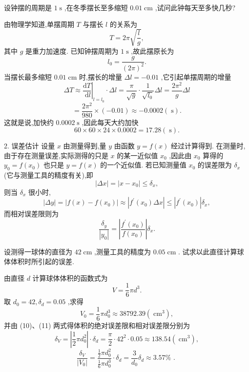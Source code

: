 \begin{example}
设钟摆的周期是 \(1\mathrm{\;s}\) ,在冬季摆长至多缩短 \({0.01}\mathrm{\;{cm}}\) ,试问此钟每天至多快几秒?
\end{example}


\begin{solution}
由物理学知道,单摆周期 \(T\) 与摆长 \(l\) 的关系为
\[
T = {2\pi }\sqrt{\frac{l}{g}},
\]
其中 \(g\) 是重力加速度. 已知钟摆周期为 \(1\mathrm{\;s}\) ,故此摆原长为
\[
{l}_{0} = \frac{g}{{\left( 2\pi \right) }^{2}}.
\]
当摆长最多缩短 \({0.01}\mathrm{\;{cm}}\) 时,摆长的增量 \({\Delta l} =  - {0.01}\) ,它引起单摆周期的增量
\[
{\Delta T} \approx  {\left. \frac{\mathrm{d}T}{\mathrm{\;d}l}\right| }_{l = {l}_{0}} \cdot  {\Delta l} = \frac{\pi }{\sqrt{g}} \cdot  \frac{1}{\sqrt{{l}_{0}}}{\Delta l} = \frac{2{\pi }^{2}}{g}{\Delta l}
\]
\[
= \frac{2{\pi }^{2}}{980} \times  \left( {-{0.01}}\right)  \approx   - {0.0002}\left( \mathrm{\;s}\right) .
\]
这就是说,加快约 \({0.0002}\mathrm{\;s}\) ,因此每天大约加快
\[
{60} \times  {60} \times  {24} \times  {0.0002} = {17.28}\left( \mathrm{\;s}\right) .
\]
\end{solution}

2. 误差估计 设量 \(x\) 由测量得到,量 \(y\) 由函数 \(y = f\left( x\right)\) 经过计算得到. 在测量时,由于存在测量误差,实际测得的只是 \(x\) 的某一近似值 \({x}_{0}\) ,因此由 \({x}_{0}\) 算得的 \({y}_{0} = f\left( {x}_{0}\right)\) 也只是 \(y = f\left( x\right)\) 的一个近似值. 若已知测量值 \({x}_{0}\) 的误差限为 \({\delta }_{x}\) (它与测量工具的精度有关),即
\[
\left| {\Delta x}\right|  = \left| {x - {x}_{0}}\right|  \leq  {\delta }_{x},
\]
则当 \({\delta }_{x}\) 很小时,
\[
\left| {\Delta y}\right|  = \left| {f\left( x\right)  - f\left( {x}_{0}\right) }\right|  \approx  \left| {{f}^{\prime }\left( {x}_{0}\right) {\Delta x}}\right|  \leq  \left| {{f}^{\prime }\left( {x}_{0}\right) }\right| {\delta }_{x}, \tag{10}
\]
而相对误差限则为
\[
\frac{{\delta }_{y}}{\left| {y}_{0}\right| } = \left| \frac{{f}^{\prime }\left( {x}_{0}\right) }{f\left( {x}_{0}\right) }\right| {\delta }_{x}. \tag{11}
\]

\begin{example}
设测得一球体的直径为 \({42}\mathrm{\;{cm}}\) ,测量工具的精度为 \({0.05}\mathrm{\;{cm}}\) . 试求以此直径计算球体体积时所引起的误差.

\end{example}

\begin{solution}
由直径 \(d\) 计算球体体积的函数式为
\[
V = \frac{1}{6}\pi {d}^{3}.
\]
取 \({d}_{0} = {42},{\delta }_{d} = {0.05}\) ,求得
\[
{V}_{0} = \frac{1}{6}\pi {d}_{0}^{3} \approx  {38792.39}\left( {\mathrm{\;{cm}}}^{3}\right) ,
\]
并由 (10)、(11) 两式得体积的绝对误差限和相对误差限分别为
\[
{\delta }_{V} = \left| {\frac{1}{2}\pi {d}_{0}^{2}}\right|  \cdot  {\delta }_{d} = \frac{\pi }{2} \cdot  {42}^{2} \cdot  {0.05} \approx  {138.54}\left( {\mathrm{\;{cm}}}^{3}\right) ,
\]
\[
\frac{{\delta }_{V}}{\left| {V}_{0}\right| } = \frac{\frac{1}{2}\pi {d}_{0}^{2}}{\frac{1}{6}\pi {d}_{0}^{3}} \cdot  {\delta }_{d} = \frac{3}{{d}_{0}}{\delta }_{d} \approx  {3.57}\% \text{ . }
\]
\end{solution}

